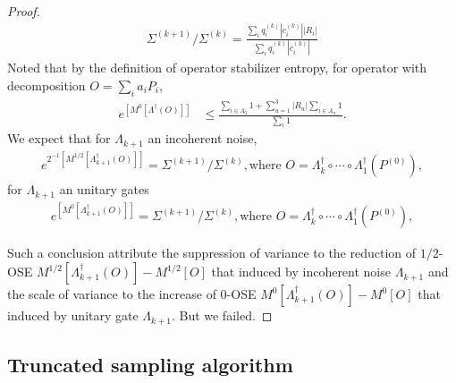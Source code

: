 \documentclass[aps,%
twocolumn,%
floatfix,%
pra,%
amsfonts,%
longbibliography,%
groupedaddress,%
superscriptaddress]{revtex4-2}%
\newcommand{\1}{\mathbbm{1}}
\begin{document}
\begin{proof}
\begin{align}
          \Sigma^{(k+1)}/ \Sigma^{(k)} = \frac{\sum_{i} q_i^{(k)}|c_i^{(k)}| |R_i|}{\sum_{i} q_i^{(k)}|c_i^{(k)}| }
      \end{align}
      Noted that by the definition of operator stabilizer entropy, for operator with decomposition $O = \sum_{i } a_i P_i$, 
      \begin{align}
          e^{\left[ M^{0}[\Lambda^\dagger(O)]\right]} &\leq \frac{\sum_{i \in A_0}1 + \sum_{u=1}^3 |R_u| \sum_{i \in A_u}1 }{\sum_{i } 1}.
      \end{align}
         \color{red} 
      We expect that for $\Lambda_{k+1}$ an incoherent noise,
      \begin{align}
           e^{2^{-1}\left[ M^{1/2}[\Lambda^\dagger_{k+1}(O)] \right]} =   \Sigma^{(k+1)}/ \Sigma^{(k)} , \text{where~} O = \Lambda_k^\dagger \circ \cdots\circ\Lambda_1^\dagger(P^{(0)}),
      \end{align}
      for $\Lambda_{k+1}$ an unitary gates
      \begin{align}
           e^{\left[ M^{0}[\Lambda^\dagger_{k+1}(O)] \right]} =   \Sigma^{(k+1)}/ \Sigma^{(k)} , \text{where~} O = \Lambda_k^\dagger \circ \cdots\circ\Lambda_1^\dagger(P^{(0)}),
      \end{align}
      
      Such a conclusion attribute the suppression of variance to the reduction of $1/2$-OSE $ M^{1/2}[\Lambda^\dagger_{k+1}(O)] - M^{1/2}[O]$ that induced by incoherent noise $\Lambda_{k+1}$ and the scale of variance to the increase of $0$-OSE $ M^{0}[\Lambda^\dagger_{k+1}(O)] - M^{0}[O]$ that induced by unitary gate $\Lambda_{k+1}$. 
      But we failed.
\color{black}
\end{proof}

\subsection{Truncated sampling algorithm}
\end{document}
